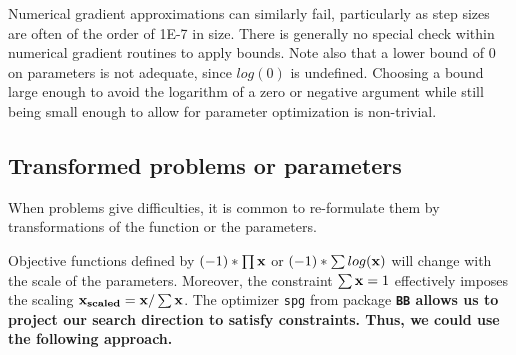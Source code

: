 \documentclass[11pt]{article}\usepackage[]{graphicx}\usepackage[]{color}
\newcommand{\B}[1]{{\bf #1 \rm}}
\newcommand{\code}[1]{{\tt#1}}
\newcommand{\pkg}[1]{\bf{\tt#1}\rm }
\begin{document}
Numerical gradient approximations can similarly fail, 
particularly as step sizes are often of the order
of 1E-7 in size. There is generally no special check within numerical 
gradient routines to apply bounds. 
Note also that a lower bound of 0 on parameters is not adequate, 
since $log(0)$ is undefined. Choosing a
bound large enough to avoid the logarithm of a zero or negative argument 
while still being small enough 
to allow for parameter optimization is non-trivial.

\subsection{Transformed problems or parameters}

When problems give difficulties, it is common to re-formulate them 
by transformations of the function
or the parameters. 

Objective functions defined by $(-1)*\prod{\B{x}}$ or $(-1)*\sum{log(\B{x})}$ will change 
with the scale of the parameters. Moreover, the constraint $\sum{\B{x}}=1$ 
effectively imposes the scaling $\B{x_{scaled}} = \B{x}/\sum{\B{x}}$. The 
optimizer \code{spg} from package \pkg{BB} allows us to project our search 
direction to satisfy constraints. Thus, we could use the following approach.
\end{document}
